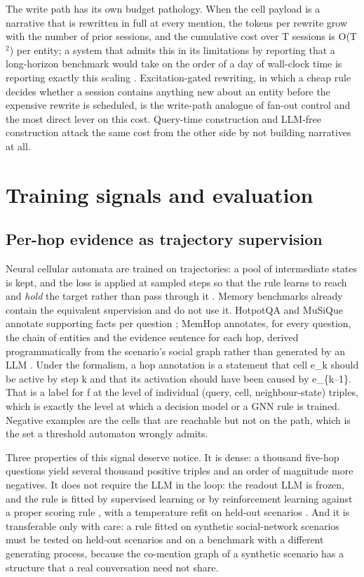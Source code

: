 \documentclass[11pt]{article}
\begin{document}
The write path has its own budget pathology. When the cell payload is a narrative that is rewritten in full at every mention, the tokens per rewrite grow with the number of prior sessions, and the cumulative cost over T sessions is O(T$^2$) per entity; a system that admits this in its limitations by reporting that a long-horizon benchmark would take on the order of a day of wall-clock time is reporting exactly this scaling \cite{prograph}. Excitation-gated rewriting, in which a cheap rule decides whether a session contains anything new about an entity before the expensive rewrite is scheduled, is the write-path analogue of fan-out control and the most direct lever on this cost. Query-time construction \cite{lazymem} and LLM-free construction \cite{edgemem} attack the same cost from the other side by not building narratives at all.

\section{Training signals and evaluation}

\subsection{Per-hop evidence as trajectory supervision}

Neural cellular automata are trained on trajectories: a pool of intermediate states is kept, and the loss is applied at sampled steps so that the rule learns to reach and \emph{hold} the target rather than pass through it \cite{nca}. Memory benchmarks already contain the equivalent supervision and do not use it. HotpotQA and MuSiQue annotate supporting facts per question \cite{hotpotqa,musique}; MemHop annotates, for every question, the chain of entities and the evidence sentence for each hop, derived programmatically from the scenario's social graph rather than generated by an LLM \cite{prograph}. Under the formalism, a hop annotation is a statement that cell e\_k should be active by step k and that its activation should have been caused by e\_\{k--1\}. That is a label for f at the level of individual (query, cell, neighbour-state) triples, which is exactly the level at which a decision model or a GNN rule is trained. Negative examples are the cells that are reachable but not on the path, which is the set a threshold automaton wrongly admits.

Three properties of this signal deserve notice. It is dense: a thousand five-hop questions yield several thousand positive triples and an order of magnitude more negatives. It does not require the LLM in the loop: the readout LLM is frozen, and the rule is fitted by supervised learning or by reinforcement learning against a proper scoring rule \cite{gneiting2007}, with a temperature refit on held-out scenarios \cite{guo2017}. And it is transferable only with care: a rule fitted on synthetic social-network scenarios must be tested on held-out scenarios and on a benchmark with a different generating process, because the co-mention graph of a synthetic scenario has a structure that a real conversation need not share.
\end{document}

